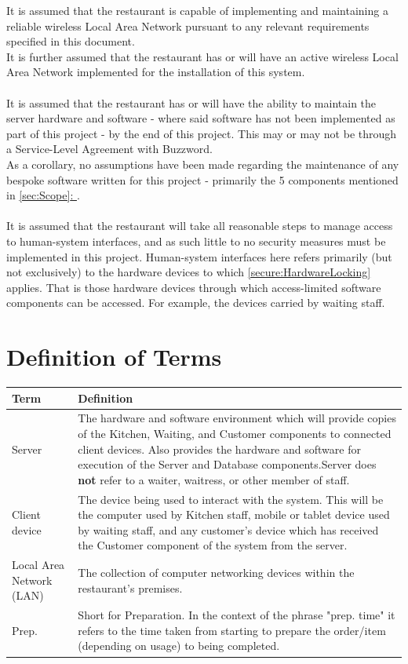 \documentclass[11pt, a4paper]{report}
\newcommand{\gref}[1]{\hyperref[#1]{\autoref*{#1}: \nameref{#1}}} %
\begin{document}
It is assumed that the restaurant is capable of implementing and maintaining a reliable wireless Local Area Network pursuant to any relevant requirements specified in this document.\\
It is further assumed that the restaurant has or will have an active wireless Local Area Network implemented for the installation of this system.\\
\\
It is assumed that the restaurant has or will have the ability to maintain the server hardware and software - where said software has not been implemented as part of this project - by the end of this project. This may or may not be through a Service-Level Agreement with Buzzword.\\
As a corollary, no assumptions have been made regarding the maintenance of any bespoke software written for this project - primarily the 5 components mentioned in \gref{sec:Scope}.\\
\\
It is assumed that the restaurant will take all reasonable steps to manage access to human-system interfaces, and as such little to no security measures must be implemented in this project. Human-system interfaces here refers primarily (but not exclusively) to the hardware devices to which \autoref{secure:HardwareLocking} applies. That is those hardware devices through which access-limited software components can be accessed. For example, the devices carried by waiting staff.

\section{Definition of Terms}
\vspace{1cm}

\begin{tabulary}{1.2\textwidth}{l L}
Term & Definition \\ \midrule

Server & The hardware and software environment which will provide copies of the Kitchen, Waiting, and Customer components to connected client devices. Also provides the hardware and software for execution of the Server and Database components.\newline Server does \textbf{not} refer to a waiter, waitress, or other member of staff. \\ \midrule
Client device & The device being used to interact with the system. This will be the computer used by Kitchen staff, mobile or tablet device used by waiting staff, and any customer's device which has received the Customer component of the system from the server.\\ \midrule
Local Area Network (LAN) & The collection of computer networking devices within the restaurant's premises. \\ \midrule
Prep. & Short for Preparation. In the context of the phrase "prep. time" it refers to the time taken from starting to prepare the order/item (depending on usage) to being completed.
\end{tabulary}
\end{document}
